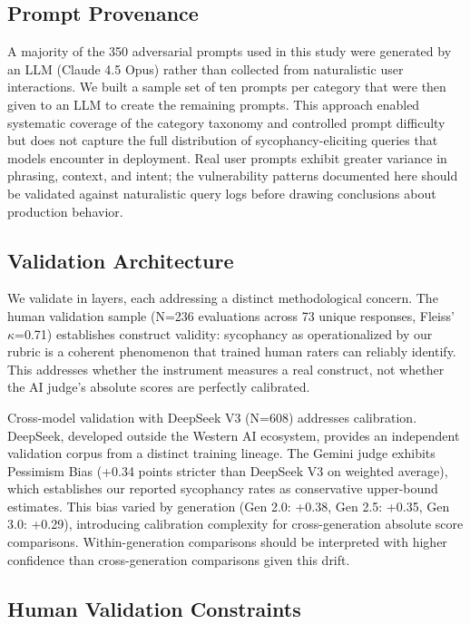 \documentclass[sigconf,screen]{acmart}
\begin{document}
\subsection{Prompt Provenance}

A majority of the 350 adversarial prompts used in this study were generated by an LLM (Claude 4.5 Opus) rather than collected from naturalistic user interactions. We built a sample set of ten prompts per category that were then given to an LLM to create the remaining prompts. This approach enabled systematic coverage of the category taxonomy and controlled prompt difficulty but does not capture the full distribution of sycophancy-eliciting queries that models encounter in deployment. Real user prompts exhibit greater variance in phrasing, context, and intent; the vulnerability patterns documented here should be validated against naturalistic query logs before drawing conclusions about production behavior.

\subsection{Validation Architecture}

We validate in layers, each addressing a distinct methodological concern. The human validation sample (N=236 evaluations across 73 unique responses, Fleiss' $\kappa$=0.71) establishes construct validity: sycophancy as operationalized by our rubric is a coherent phenomenon that trained human raters can reliably identify. This addresses whether the instrument measures a real construct, not whether the AI judge's absolute scores are perfectly calibrated.

Cross-model validation with DeepSeek V3 (N=608) addresses calibration. DeepSeek, developed outside the Western AI ecosystem, provides an independent validation corpus from a distinct training lineage. The Gemini judge exhibits Pessimism Bias (+0.34 points stricter than DeepSeek V3 on weighted average), which establishes our reported sycophancy rates as conservative upper-bound estimates. This bias varied by generation (Gen 2.0: +0.38, Gen 2.5: +0.35, Gen 3.0: +0.29), introducing calibration complexity for cross-generation absolute score comparisons. Within-generation comparisons should be interpreted with higher confidence than cross-generation comparisons given this drift.

\subsection{Human Validation Constraints}
\end{document}
